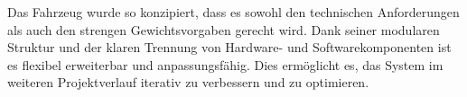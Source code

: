 \documentclass[main.tex]{subfiles} %
\begin{document}
Das Fahrzeug wurde so konzipiert, dass es sowohl den technischen Anforderungen als auch den strengen Gewichtsvorgaben gerecht wird. Dank seiner modularen Struktur und der klaren Trennung von Hardware- und Softwarekomponenten ist es flexibel erweiterbar und anpassungsfähig. Dies ermöglicht es, das System im weiteren Projektverlauf iterativ zu verbessern und zu optimieren.
\end{document}
